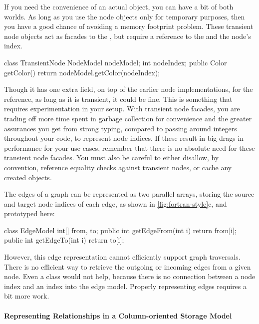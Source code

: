 If you need the convenience of an actual  object, you can have a
bit of both worlds. As long as you use the node objects
only for temporary purposes, then you have a good chance of avoiding a memory
footprint problem. These transient node objects act as facades to the
, but require a reference to the  and the
node's index. 
\begin{shortlisting}
class TransientNode {
   NodeModel nodeModel;
   int nodeIndex;
   public Color getColor() {
      return nodeModel.getColor(nodeIndex);
   }
}
\end{shortlisting}
Though it has one extra field, on top of the earlier node implementations, for
the  reference, as long as it is transient, it could be fine.
This is something that requires experimentation in your setup. With transient
node facades, you are trading off more time spent in garbage collection for
convenience and the greater assurances you get from strong typing, compared to
passing around integers throughout your code, to represent node indices.
If these result in big drags in performance for your use cases, remember
that there is no absolute need for these transient node facades. You must also
be careful to either disallow, by convention, reference equality checks against
transient nodes, or cache any created objects.

The edges of a graph can be represented as two parallel arrays, storing the
source and target node indices of each edge, as shown in
\autoref{fig:fortran-style}c, and prototyped here:
\begin{shortlisting}
class EdgeModel {
   int[] from, to;
   public int getEdgeFrom(int i) {
      return from[i];
   }
   public int getEdgeTo(int i) {
      return to[i];
   }
}
\end{shortlisting}
However, this edge representation cannot efficiently support graph
traversals. There is no efficient way to retrieve the outgoing or
incoming edges from a given node. Even a  class would not
help, because there is no connection between a node index and an index
into the edge model. Properly representing edges requires a bit more work. 

\paragraph{Representing Relationships in a Column-oriented Storage Model}

